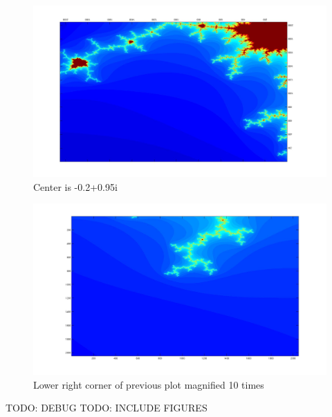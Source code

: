 \begin{figure}[H]
\centering
\includegraphics[width=1\textwidth]{img/mandelzoomc01095.jpg}
\caption{Center is -0.2+0.95i}
\end{figure}


\begin{figure}[H]
\centering
\includegraphics[width=1\textwidth]{img/mandelzoom2.jpg}
\caption{Lower right corner of previous plot magnified 10 times}
\end{figure}
TODO: DEBUG
TODO: INCLUDE FIGURES
